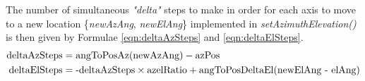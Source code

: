 \noindent The number of simultaneous \textit{"delta"} steps to make in order for each axis to move to a new location \{\textit{newAzAng}, \textit{newElAng}\} implemented in \textit{setAzimuthElevation()} is then given by Formulae \ref{eqn:deltaAzSteps} and \ref{eqn:deltaElSteps}.
\begin{align}
    \textnormal{deltaAzSteps} &= \textnormal{angToPosAz(newAzAng)} - \textnormal{azPos} \label{eqn:deltaAzSteps} \\ 
    \textnormal{deltaElSteps} &= \textnormal{-deltaAzSteps} \times \textnormal{azelRatio} + \textnormal {angToPosDeltaEl(newElAng - elAng)}\label{eqn:deltaElSteps} 
\end{align}